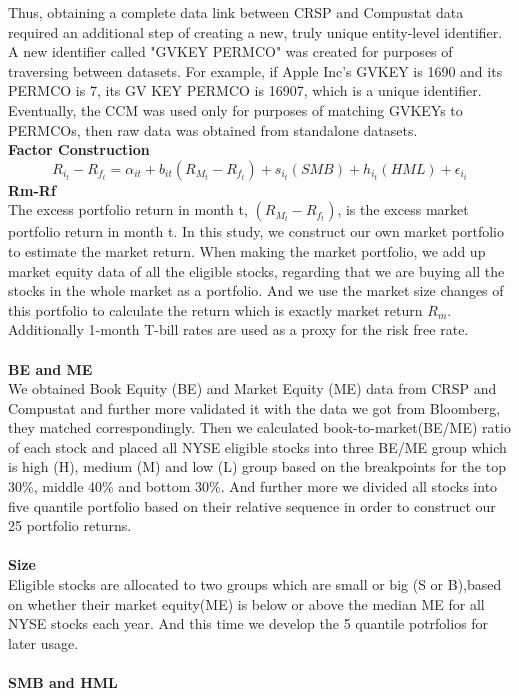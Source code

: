 \documentclass[12pt]{article}
\begin{document}
\noindent Thus, obtaining a complete data link between CRSP and Compustat data required an additional step of creating a new, truly unique entity-level identifier. A new identifier called "GVKEY PERMCO" was created for purposes of traversing between datasets.
For example, if Apple Inc’s GVKEY is 1690 and its PERMCO is 7, its GV KEY PERMCO is 16907, which is a unique identifier. Eventually, the CCM was used only for purposes of matching GVKEYs to PERMCOs, then raw data was obtained from standalone datasets.\\

\noindent \textbf{Factor Construction}\\
$$
R_{i_t}-R_{f_t}=\alpha_{it}+b_{it}(R_{M_t}-R_{f_t})+s_{i_t}(SMB)+h_{i_t}(HML)+\epsilon_{i_t}
$$
\textbf{Rm-Rf}\\
The excess portfolio return in month t, $(R_{M_t}-R_{f_t})$, is the excess market portfolio return in month t. In this study, we construct our own market portfolio to estimate the market return. When making the market portfolio, we add up market equity data of all the eligible stocks, regarding that we are buying all the stocks in the whole market as a portfolio. And we use the market size changes of this portfolio to calculate the return which is exactly market return $R_m$. Additionally 1-month T-bill rates are used as a proxy for the risk free rate.\\ \\
\textbf{BE and ME}\\
We obtained Book Equity (BE) and Market Equity (ME) data from CRSP and Compustat and further more validated it with the data we got from Bloomberg, they matched correspondingly. Then we calculated book-to-market(BE/ME) ratio of each stock and placed all NYSE eligible stocks into three BE/ME group which is high (H), medium (M) and low (L) group based on the breakpoints for the top 30\%, middle 40\% and bottom 30\%. And further more we divided all stocks into five quantile portfolio based on their relative sequence in order to construct our 25 portfolio returns.\\ \\
\textbf{Size}\\
Eligible stocks are allocated to two groups which are small or big (S or B),based on whether their market equity(ME) is below or above the median ME for all NYSE stocks each year. And this time we develop the 5 quantile potrfolios for later usage. \\ \\
\textbf{SMB and HML}\\
\end{document}
